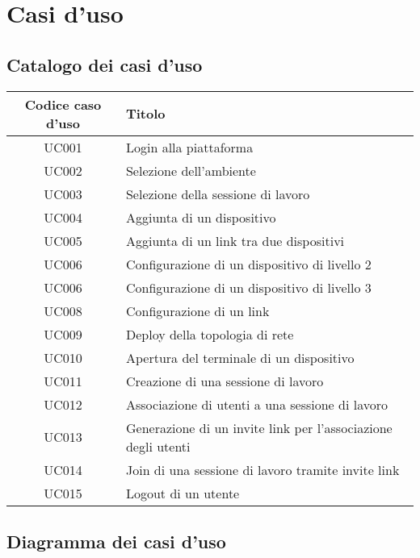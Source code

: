 \documentclass[../main.tex]{subfiles}
\begin{document}
\chapter{Casi d'uso}
\section{Catalogo dei casi d'uso}
\begin{tabularx}{150mm}{|c|X|}
    \hline
    \textbf{Codice caso d'uso}          & \textbf{Titolo} \\
    \hline
    UC001   &   Login alla piattaforma \\
    \hline
    UC002   &   Selezione dell'ambiente \\
    \hline
    UC003   &   Selezione della sessione di lavoro \\
    \hline
    UC004   &   Aggiunta di un dispositivo \\
    \hline
    UC005   &   Aggiunta di un link tra due dispositivi \\
    \hline
    UC006   &   Configurazione di un dispositivo di livello 2 \\
    \hline
    UC006   &   Configurazione di un dispositivo di livello 3 \\
    \hline
    UC008   &   Configurazione di un link \\
    \hline
    UC009   &   Deploy della topologia di rete \\ 
    \hline
    UC010   &   Apertura del terminale di un dispositivo \\
    \hline
    UC011   &   Creazione di una sessione di lavoro \\
    \hline
    UC012   &   Associazione di utenti a una sessione di lavoro \\
    \hline
    UC013   &   Generazione di un invite link per l'associazione degli utenti \\
    \hline
    UC014   &   Join di una sessione di lavoro tramite invite link \\
    \hline
    UC015   &   Logout di un utente \\
    \hline
\end{tabularx}
\newpage
\section{Diagramma dei casi d'uso}
\end{document}
